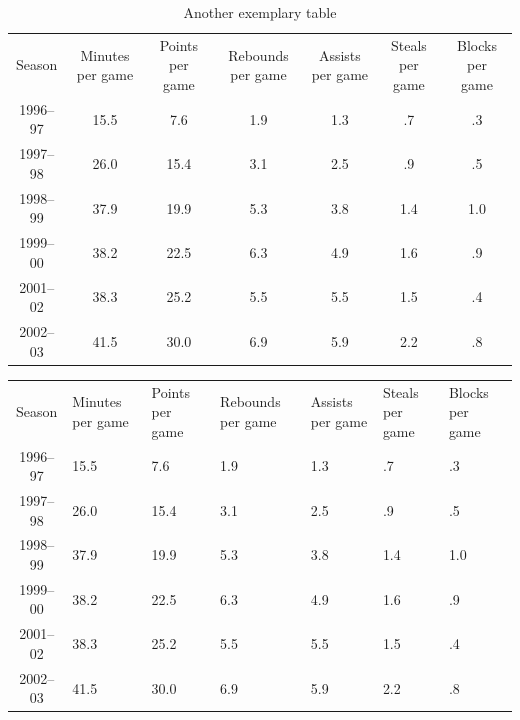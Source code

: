 	\begin{table}[h!]
		\centering
		\begin{tabular}{| c  c  c  c  c  c  c |}
			\hline
			\rowcolor{lal-p!60}
			Season  & Minutes per game  & Points per game  & Rebounds per game & Assists per game &	Steals per game & Blocks per game \\
			1996–97 & 15.5 & 7.6  & 1.9 & 1.3 &  .7	&  .3 \\
			1997–98	& 26.0 & 15.4 &	3.1	& 2.5 &	 .9	&  .5 \\
			1998–99	& 37.9 & 19.9 &	5.3 & 3.8 &	1.4	& 1.0 \\
			1999–00	& 38.2 & 22.5 &	6.3	& 4.9 &	1.6	&  .9 \\
			2001–02 & 38.3 & 25.2 &	5.5	& 5.5 &	1.5	&  .4 \\
			2002–03 & 41.5 & 30.0 & 6.9 & 5.9 & 2.2 &  .8 \\
		\end{tabular}
		\caption{Another exemplary table}
		\label{table_4}
	\end{table}  
	
	\begin{table}
		\centering
		\begin{tabularx}{\textwidth}{| c | X | X | X | X | X | X |}
			\rowcolor{lal-p!60}
			Season  & Minutes per game  & Points per game  & Rebounds per game & Assists per game &	Steals per game & Blocks per game \\
			1996–97 & 15.5 & 7.6  & 1.9 & 1.3 &  .7	&  .3 \\
			1997–98	& 26.0 & 15.4 &	3.1	& 2.5 &	 .9	&  .5 \\
			1998–99	& 37.9 & 19.9 &	5.3 & 3.8 &	1.4	& 1.0 \\
			1999–00	& 38.2 & 22.5 &	6.3	& 4.9 &	1.6	&  .9 \\
			2001–02 & 38.3 & 25.2 &	5.5	& 5.5 &	1.5	&  .4 \\
			2002–03 & 41.5 & 30.0 & 6.9 & 5.9 & 2.2 &  .8 \\
		\end{tabularx}
	\end{table}

	

